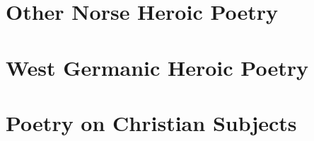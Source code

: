 \part{Other Norse Heroic Poetry}

\part{West Germanic Heroic Poetry}



\part{Poetry on Christian Subjects}
	
	
	

